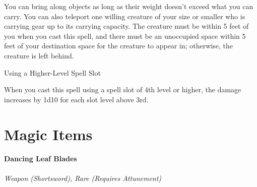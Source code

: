 \documentclass[letterpaper,openany,oneside,twocolumn]{book}
\begin{document}
You can bring along objects as long as their weight doesn't exceed what you can carry. You can also teleport one willing creature of your size or smaller who is carrying gear up to its carrying capacity. The creature must be within 5 feet of you when you cast this spell, and there must be an unoccupied space within 5 feet of your destination space for the creature to appear in; otherwise, the creature is left behind.

\subparagraph*{Using a Higher-Level Spell Slot} When you cast this spell using a spell slot of 4th level or higher, the damage increases by 1d10 for each slot level above 3rd.

\part*{Magic Items}
\subsection*{Dancing Leaf Blades}
\textit{Weapon (Shortsword), Rare (Requires Attunement)}\\
\end{document}
